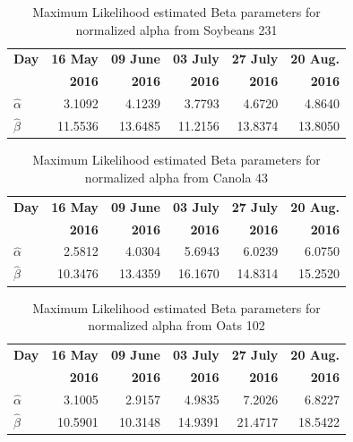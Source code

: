 \documentclass[journal]{IEEEtran}
\begin{document}
\begin{table}[hbt]
  \centering
  \caption{Maximum Likelihood estimated Beta parameters for normalized alpha from Soybeans 231}
  \label{tab:params_helicity}
  \begin{tabular}{lrrrrr}
    \toprule
    \textbf{Day} & \textbf{16 May} & \textbf{09 June} & \textbf{03 July} & \textbf{27 July} & \textbf{20 Aug.}\\ 
                 & \textbf{2016} & \textbf{2016} & \textbf{2016} & \textbf{2016} & \textbf{2016}\\\midrule
    \textbf{$\hat{\alpha}$} & 3.1092 & 4.1239 & 3.7793 & 4.6720 & 4.8640\\
    \textbf{$\hat{\beta}$} & 11.5536 & 13.6485 & 11.2156 & 13.8374 & 13.8050\\
    \bottomrule
  \end{tabular}
\end{table}

\begin{table}[hbt]
  \centering
  \caption{Maximum Likelihood estimated Beta parameters for normalized alpha from Canola 43}
  \label{tab:params_alpha_cn43}
  \begin{tabular}{lrrrrr}
    \toprule
    \textbf{Day} & \textbf{16 May} & \textbf{09 June} & \textbf{03 July} & \textbf{27 July} & \textbf{20 Aug.}\\ 
                 & \textbf{2016} & \textbf{2016} & \textbf{2016} & \textbf{2016} & \textbf{2016}\\\midrule
    \textbf{$\hat{\alpha}$} & 2.5812 & 4.0304 & 5.6943 & 6.0239 & 6.0750\\
    \textbf{$\hat{\beta}$} & 10.3476 & 13.4359 & 16.1670 & 14.8314 & 15.2520\\
    \bottomrule
  \end{tabular}
\end{table}

\begin{table}[hbt]
  \centering
  \caption{Maximum Likelihood estimated Beta parameters for normalized alpha from Oats 102}
  \label{tab:params_alpha_ot102}
  \begin{tabular}{lrrrrr}
    \toprule
    \textbf{Day} & \textbf{16 May} & \textbf{09 June} & \textbf{03 July} & \textbf{27 July} & \textbf{20 Aug.}\\ 
                 & \textbf{2016} & \textbf{2016} & \textbf{2016} & \textbf{2016} & \textbf{2016}\\\midrule
    \textbf{$\hat{\alpha}$} & 3.1005  & 2.9157 & 4.9835 & 7.2026 & 6.8227\\
    \textbf{$\hat{\beta}$} & 10.5901 & 10.3148 & 14.9391 & 21.4717 & 18.5422\\
    \bottomrule
  \end{tabular}
\end{table}
\end{document}
